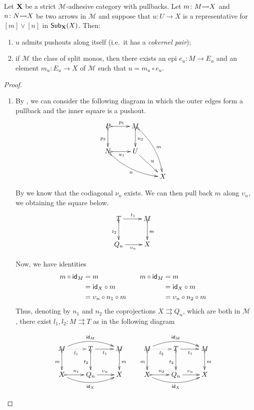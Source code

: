 \begin{lemma}\label{lem:fact2}
	Let $\textbf {\textup{X}}$ be a strict $\mathcal{M}$-adhesive category with pullbacks. Let $m\colon M\mto X$ and $n\colon N\mto X$ be two arrows in $\mathcal{M}$ and suppose that $u\colon U\to X$ is a representative for $[m]\vee[n]$ in $\mathsf{Sub}_{\textbf {\textup{X}}}(X)$. Then:
	\begin{enumerate}
		\item $u$ admits pushouts  along itself (i.e.~it has a \emph{cokernel pair}); 
		\item if $\mathcal{M}$ the class of split monos, then there exists an epi $e_u\colon M\to E_u$ and an element $m_u\colon  E_u\to X$ of $\mathcal{M}$ such that   $u=m_u\circ e_u$.
	\end{enumerate}
\end{lemma}

\begin{proof}
	\begin{enumerate}
		\item 
		By , we can consider the following diagram	in which the outer edges form a pullback and the inner square is a pushout.
		\[\xymatrix{P \ar@{>->}[r]^{p_1} \ar@{>->}[d]_{p_2} & M\ar@{>->}[d]^{u_2} \ar@{>->}@/^.3cm/[ddr]^{m} \\ N \ar@{>->}@/_.3cm/[drr]_{n}\ar@{>->}[r]_{u_1} & U \ar[dr]^{u} \\ && X}\]
		
		By  we know that the codiagonal $\nu_n$ exists. We can then pull back $m$ along $\upsilon_n$, we obtaining the square below.
		\[\xymatrix{T\ar[r]^{t_1}  \ar@{>->}[d]_{t_2}& M\ar@{>->}[d]^{m}\\ Q_{n} \ar[r]_{\upsilon_n} & X}\]
	
		Now, we have identities
		\[\begin{split}
			m \circ \mathsf{id}_{M}&=m \\&=\mathsf{id}_{X} \circ  m \\&=\upsilon_n\circ n_1 \circ m
		\end{split} \qquad \begin{split}
			m \circ \mathsf{id}_{M}&=m \\&=\mathsf{id}_{X} \circ  m \\&=\upsilon_n\circ n_2\circ m
		\end{split}\]
		Thus, denoting by $n_1$ and $n_2$ the coprojections $X\rightrightarrows Q_n$, which are both in $\mathcal{M}$, there exist $l_1, l_2\colon M\rightrightarrows T$ as in the following diagram
		
			\[\xymatrix{ M\ar@{.>}[r]_{l_1} \ar@/^.4cm/[rr]^{\id{M}} \ar@{>->}[d]_{m}&T\ar[r]_{t_1}  \ar@{>->}[d]_{t_2}& M\ar@{>->}[d]^{m} & M\ar@{.>}[r]_{l_2} \ar@/^.4cm/[rr]^{\id{M}} \ar@{>->}[d]_{m}&T\ar[r]_{t_1}  \ar@{>->}[d]_{t_2}& M\ar@{>->}[d]^{m}\\ X  \ar@/_.4cm/[rr]_{\id{X}} \ar@{>->}[r]^{n_1}&Q_{n} \ar[r]^{\upsilon_n} & X & X \ar@/_.4cm/[rr]_{\id{X}} \ar@{>->}[r]^{n_2} &Q_{n} \ar[r]^{\upsilon_n} & X}\]
		

\end{enumerate}
\end{proof}
